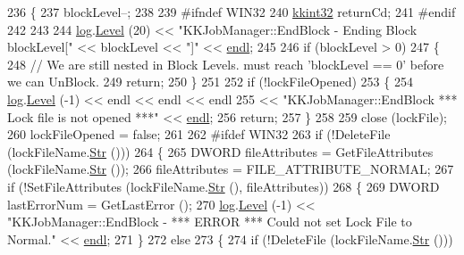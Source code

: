 \begin{DoxyCode}
236 \{
237   blockLevel--;
238 
239 \textcolor{preprocessor}{  #ifndef  WIN32}
240   \hyperlink{namespace_k_k_b_a8fa4952cc84fda1de4bec1fbdd8d5b1b}{kkint32}  returnCd;
241 \textcolor{preprocessor}{  #endif}
242   
243  
244   \hyperlink{class_k_k_job_managment_1_1_k_k_job_ad2466a68d9a01778e0f08af0478b94e5}{log}.\hyperlink{class_k_k_b_1_1_run_log_a32cf761d7f2e747465fd80533fdbb659}{Level} (20) << \textcolor{stringliteral}{"KKJobManager::EndBlock - Ending Block    blockLevel["} << blockLevel << \textcolor{stringliteral}{"]"} << 
      \hyperlink{namespace_k_k_b_ad1f50f65af6adc8fa9e6f62d007818a8}{endl};
245 
246   \textcolor{keywordflow}{if}  (blockLevel > 0)
247   \{
248     \textcolor{comment}{// We are still nested in Block Levels.  must reach 'blockLevel == 0' before we can UnBlock.}
249     \textcolor{keywordflow}{return};
250   \}
251 
252   \textcolor{keywordflow}{if}  (!lockFileOpened)
253   \{
254     \hyperlink{class_k_k_job_managment_1_1_k_k_job_ad2466a68d9a01778e0f08af0478b94e5}{log}.\hyperlink{class_k_k_b_1_1_run_log_a32cf761d7f2e747465fd80533fdbb659}{Level} (-1) << endl << endl << endl
255                    << \textcolor{stringliteral}{"KKJobManager::EndBlock          *** Lock file is not opened ***"} << 
      \hyperlink{namespace_k_k_b_ad1f50f65af6adc8fa9e6f62d007818a8}{endl};
256     \textcolor{keywordflow}{return};
257   \}
258 
259   close (lockFile);
260   lockFileOpened = \textcolor{keyword}{false};
261 
262 \textcolor{preprocessor}{  #ifdef  WIN32}
263   \textcolor{keywordflow}{if}  (!DeleteFile (lockFileName.\hyperlink{class_k_k_b_1_1_k_k_str_ad574e6c0fe7f6ce1ba3ab0a8ce2fbd52}{Str} ()))
264   \{
265      DWORD fileAttributes = GetFileAttributes (lockFileName.\hyperlink{class_k_k_b_1_1_k_k_str_ad574e6c0fe7f6ce1ba3ab0a8ce2fbd52}{Str} ());
266      fileAttributes = FILE\_ATTRIBUTE\_NORMAL;
267      \textcolor{keywordflow}{if}  (!SetFileAttributes (lockFileName.\hyperlink{class_k_k_b_1_1_k_k_str_ad574e6c0fe7f6ce1ba3ab0a8ce2fbd52}{Str} (), fileAttributes))
268      \{
269        DWORD  lastErrorNum = GetLastError ();
270        \hyperlink{class_k_k_job_managment_1_1_k_k_job_ad2466a68d9a01778e0f08af0478b94e5}{log}.\hyperlink{class_k_k_b_1_1_run_log_a32cf761d7f2e747465fd80533fdbb659}{Level} (-1) << \textcolor{stringliteral}{"KKJobManager::EndBlock - *** ERROR *** Could not set Lock File  to 
       Normal."} << \hyperlink{namespace_k_k_b_ad1f50f65af6adc8fa9e6f62d007818a8}{endl};
271      \}
272      \textcolor{keywordflow}{else}
273      \{
274        \textcolor{keywordflow}{if}  (!DeleteFile (lockFileName.\hyperlink{class_k_k_b_1_1_k_k_str_ad574e6c0fe7f6ce1ba3ab0a8ce2fbd52}{Str} ()))

\end{DoxyCode}

